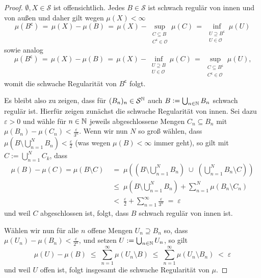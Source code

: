 \documentclass[../main/main.tex]{subfiles}
\begin{document}
	\begin{proof}
		$\emptyset, X \in \mathcal{S}$ ist offensichtlich. Jedes $B \in \mathcal{S}$ ist schwach regulär 
		von innen und von außen und daher gilt wegen $\mu(X) < \infty$
		$$\mu(B^\mathsf{c}) \, = \, \mu(X) - \mu(B) \, = \, \mu(X) - \sup_{\substack{C \subseteq B \\ 
				C^\mathsf{c} \in \mathcal{O}}} \mu(C) \, = \, \inf_{\substack{U \supseteq B^\mathsf{c} \\ 
				U \in \mathcal{O}}} \mu(U)$$
		sowie analog
		$$\mu(B^\mathsf{c}) \, = \, \mu(X) - \mu(B) \, = \, \mu(X) - \inf_{\substack{U \supseteq B \\ 
				U \in \mathcal{O}}} \mu(C) \, = \, \sup_{\substack{C \subseteq B^\mathsf{c} \\ C^\mathsf{c} 
				\in \mathcal{O}}} \mu(U) \text{,}$$
		womit die schwache Regularität von $B^\mathsf{c}$ folgt. 
		
		Es bleibt also zu zeigen, dass für $(B_n)_n \in \mathcal{S}^{\mathbb{N}}$ auch $B \vcentcolon = 
		\bigcup_{n \in \mathbb{N}} B_n$ schwach regulär ist. 
		Hierfür zeigen zunächst die schwache Regularität von innen. 
		Sei dazu $\varepsilon > 0$ und wähle für $n \in \mathbb{N}$ jeweils abgeschlossene Mengen 
		$C_n \subseteq B_n$ mit $\mu(B_n) - \mu(C_n) < \frac{\varepsilon}{3^n}$.
		Wenn wir nun $N$ so groß wählen, dass $\mu\left( B \setminus \bigcup_{n=1}^N B_n \right) 
		< \frac{\varepsilon}{2}$ 
		(was wegen $\mu(B) < \infty$ immer geht), so gilt mit $C := \bigcup_{n=1}^N C_k$, dass 
		\begin{align*}
			\mu(B) - \mu(C) = \mu(B\setminus C) \; &=
			    \; \mu\left( \left( B \setminus \bigcup_{n=1}^N B_n \right) \; \cup \; 
			    \left( \bigcup_{n=1}^N B_n  \setminus C \right) \right) \\
			&\leq \; \mu \left( B \setminus \bigcup_{n=1}^N B_n \right) + 
			\sum_{n=1}^{N} \mu(B_n \setminus C_n) \\
			&<    \; \frac{\varepsilon}{2} + 
			\sum_{n=1}^{\infty} \frac{\varepsilon}{3^n} \; = \; \varepsilon
		\end{align*}
		und weil $C$ abgeschlossen ist, folgt, dass $B$ schwach regulär von innen ist.
		
		Wählen wir nun für alle $n$ offene Mengen $U_n \supseteq B_n$ so, 
		dass $\mu(U_n) - \mu(B_n) < \frac{\varepsilon}{2^n}$, und setzen 
		$U := \bigcup_{n \in \mathbb{N}} U_n$, so gilt 
		$$\mu(U) - \mu(B) \; \leq \; \sum_{n=1}^\infty \mu(U_n \setminus B) \; \leq \; 
		\sum_{n=1}^\infty \mu(U_n \setminus B_n) \; < \; \varepsilon$$
		und weil $U$ offen ist, folgt insgesamt die schwache Regularität von $\mu$.
	\end{proof}
\end{document}
